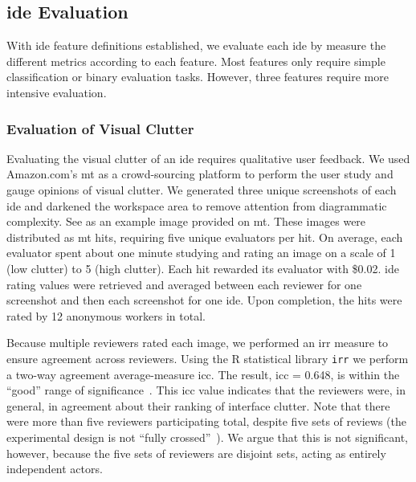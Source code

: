 \subsection{\acs{ide} Evaluation} \label{subsec:ideevaluation}

With \ac{ide} feature definitions established, we evaluate each \ac{ide} by measure the different metrics according to each feature.
Most features only require simple classification or binary evaluation tasks.
However, three features require more intensive evaluation.


\subsubsection{Evaluation of Visual Clutter} \label{subsubsec:mturk}

Evaluating the visual clutter of an \ac{ide} requires qualitative user feedback.
We used Amazon.com's \ac{mt} as a crowd-sourcing platform to perform the user study and gauge opinions of visual clutter.
We generated three unique screenshots of each \ac{ide} and darkened the
workspace area to remove attention from diagrammatic complexity. See
 as an example image provided on \ac{mt}.
These images were distributed as \ac{mt} \acp{hit}, requiring five unique evaluators per \ac{hit}.
On average, each evaluator spent about one minute studying and rating an image on a scale of 1 (low clutter) to 5 (high clutter).
Each \ac{hit} rewarded its evaluator with \$0.02.
\ac{ide} rating values were retrieved and averaged between each reviewer for one screenshot and then each screenshot for one \ac{ide}.
Upon completion, the \acp{hit} were rated by 12 anonymous workers in total.

Because multiple reviewers rated each image, we performed an \ac{irr} measure to ensure agreement across reviewers.
Using the R statistical library \texttt{irr} we perform a two-way agreement average-measure \ac{icc}.
The result, \ac{icc} = 0.648, is within the ``good'' range of significance~\cite{cicchetti1994,hallgren2012}.
This \ac{icc} value indicates that the reviewers were, in general, in agreement about their ranking of interface clutter.
Note that there were more than five reviewers participating total, despite five sets of reviews (\ie the experimental design is not ``fully crossed''~\cite{hallgren2012}).
We argue that this is not significant, however, because the five sets of reviewers are disjoint sets, acting as entirely independent actors.

